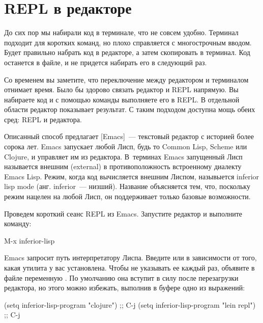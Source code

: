 \section{REPL в редакторе}

До сих пор мы набирали код в терминале, что не совсем удобно. Терминал подходит для коротких команд, но плохо справляется с многострочным вводом. Будет правильно набрать код в редакторе, а затем скопировать в терминал. Код останется в файле, и не придется набирать его в следующий раз.

Со временем вы заметите, что переключение между редактором и терминалом отнимает время. Было бы здорово связать редактор и REPL напрямую. Вы набираете код и с помощью команды выполняете его в REPL. В отдельной области редактор показывает результат. С таким подходом доступна мощь обеих сред: REPL и редактора.

\def\urlemacs{https://www.gnu.org/software/emacs/}

Описанный способ предлагает \footurl{Emacs}{\urlemacs}[Emacs]~--- текстовый редактор с историей более сорока лет. Emacs запускает любой Лисп, будь то Common Lisp, Scheme или Clojure, и управляет им из редактора. В~терминах Emacs запущенный Лисп называется внешним (external) в противоположность встроенному диалекту Emacs Lisp. Режим, когда код вычисляется внешним Лиспом, назывыется inferior lisp mode (анг. inferior~--- низший). Название объясняется тем, что, поскольку режим нацелен на любой Лисп, он поддерживает только базовые возможности.

Проведем короткий сеанс REPL из Emacs. Запустите редактор и выполните команду:

\begin{english}
  \begin{text}
M-x inferior-lisp
  \end{text}
\end{english}

Emacs запросит путь интерпретатору Лиспа. Введите  или  в зависимости от того, какая утилита у вас установлена. Чтобы не указывать ее каждый раз, объявите в файле  переменную . По умолчанию она вступит в силу после перезагрузки редактора, но этого можно избежать, выполнив в буфере  одно из выражений:

\begin{english}
  \begin{lisp}
(setq inferior-lisp-program "clojure") ;; C-j
(setq inferior-lisp-program "lein repl") ;; C-j
  \end{lisp}
\end{english}

